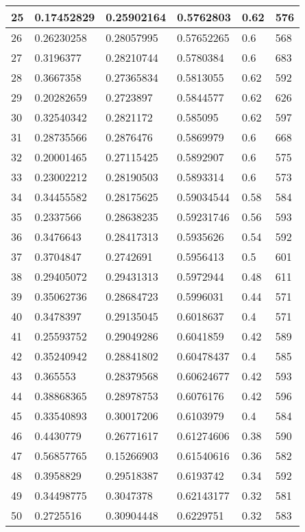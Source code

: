 \begin{longtable}{|l|l|l|l|l|l|}
25 & 0.17452829 & 0.25902164 & 0.5762803 & 0.62 & 576 \\ \hline 
26 & 0.26230258 & 0.28057995 & 0.57652265 & 0.6 & 568 \\ \hline 
27 & 0.3196377 & 0.28210744 & 0.5780384 & 0.6 & 683 \\ \hline 
28 & 0.3667358 & 0.27365834 & 0.5813055 & 0.62 & 592 \\ \hline 
29 & 0.20282659 & 0.2723897 & 0.5844577 & 0.62 & 626 \\ \hline 
30 & 0.32540342 & 0.2821172 & 0.585095 & 0.62 & 597 \\ \hline 
31 & 0.28735566 & 0.2876476 & 0.5869979 & 0.6 & 668 \\ \hline 
32 & 0.20001465 & 0.27115425 & 0.5892907 & 0.6 & 575 \\ \hline 
33 & 0.23002212 & 0.28190503 & 0.5893314 & 0.6 & 573 \\ \hline 
34 & 0.34455582 & 0.28175625 & 0.59034544 & 0.58 & 584 \\ \hline 
35 & 0.2337566 & 0.28638235 & 0.59231746 & 0.56 & 593 \\ \hline 
36 & 0.3476643 & 0.28417313 & 0.5935626 & 0.54 & 592 \\ \hline 
37 & 0.3704847 & 0.2742691 & 0.5956413 & 0.5 & 601 \\ \hline 
38 & 0.29405072 & 0.29431313 & 0.5972944 & 0.48 & 611 \\ \hline 
39 & 0.35062736 & 0.28684723 & 0.5996031 & 0.44 & 571 \\ \hline 
40 & 0.3478397 & 0.29135045 & 0.6018637 & 0.4 & 571 \\ \hline 
41 & 0.25593752 & 0.29049286 & 0.6041859 & 0.42 & 589 \\ \hline 
42 & 0.35240942 & 0.28841802 & 0.60478437 & 0.4 & 585 \\ \hline 
43 & 0.365553 & 0.28379568 & 0.60624677 & 0.42 & 593 \\ \hline 
44 & 0.38868365 & 0.28978753 & 0.6076176 & 0.42 & 596 \\ \hline 
45 & 0.33540893 & 0.30017206 & 0.6103979 & 0.4 & 584 \\ \hline 
46 & 0.4430779 & 0.26771617 & 0.61274606 & 0.38 & 590 \\ \hline 
47 & 0.56857765 & 0.15266903 & 0.61540616 & 0.36 & 582 \\ \hline 
48 & 0.3958829 & 0.29518387 & 0.6193742 & 0.34 & 592 \\ \hline 
49 & 0.34498775 & 0.3047378 & 0.62143177 & 0.32 & 581 \\ \hline 
50 & 0.2725516 & 0.30904448 & 0.6229751 & 0.32 & 583 \\ \hline 
\end{longtable}